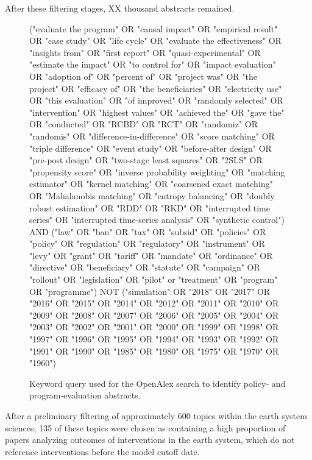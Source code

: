 \documentclass[12pt,a4paper]{article}
\begin{document}
After these filtering stages, XX thousand abstracts remained.

\begin{figure}[htbp]
  \centering
  \begin{tcolorbox}[left=4pt, right=4pt, top=4pt, bottom=4pt]
\ttfamily\footnotesize
("evaluate the program" OR "causal impact" OR "empirical result" OR "case study" OR "life cycle" OR "evaluate the effectiveness" OR "insights from" OR "first report" OR "quasi-experimental" OR "estimate the impact" OR "to control for" OR "impact evaluation" OR "adoption of" OR "percent of" OR "project was" OR "the project" OR "efficacy of" OR "the beneficiaries" OR "electricity use" OR "this evaluation" OR "of improved" OR "randomly selected" OR "intervention" OR "highest values" OR "achieved the" OR "gave the" OR "conducted" OR "RCBD" OR "RCT" OR "randomiz" OR "randomis" OR "difference-in-difference" OR "score matching" OR "triple difference" OR "event study" OR "before-after design" OR "pre-post design" OR "two-stage least squares" OR "2SLS" OR "propensity score" OR "inverse probability weighting" OR "matching estimator" OR "kernel matching" OR "coarsened exact matching" OR "Mahalanobis matching" OR "entropy balancing" OR "doubly robust estimation" OR "RDD" OR "RKD" OR "interrupted time series" OR "interrupted time-series analysis" OR "synthetic control") AND ("law" OR "ban" OR "tax" OR "subsid" OR "policies" OR "policy" OR "regulation" OR "regulatory" OR "instrument" OR "levy" OR "grant" OR "tariff" OR "mandate" OR "ordinance" OR "directive" OR "beneficiary" OR "statute" OR "campaign" OR "rollout" OR "legislation" OR "pilot" or "treatment" OR "program" OR "programme") NOT ("simulation" OR "2018" OR "2017" OR "2016" OR "2015" OR "2014" OR "2012" OR "2011" OR "2010" OR "2009" OR "2008" OR "2007" OR "2006" OR "2005" OR "2004" OR "2003" OR "2002" OR "2001" OR "2000" OR "1999" OR "1998" OR "1997" OR "1996" OR "1995" OR "1994" OR "1993" OR "1992" OR "1991" OR "1990" OR "1985" OR "1980" OR "1975" OR "1970" OR "1960")
  \end{tcolorbox}
  \caption{Keyword query used for the OpenAlex search to identify policy‐ and program‐evaluation abstracts.}
  \label{fig:OpenAlex-query}
\end{figure}

After a preliminary filtering of approximately 600 topics within the earth system sciences, 135 of these topics were chosen as containing a high proportion of papers analyzing outcomes of interventions in the earth system, which do not reference interventions before the model cutoff date. 
\end{document}

